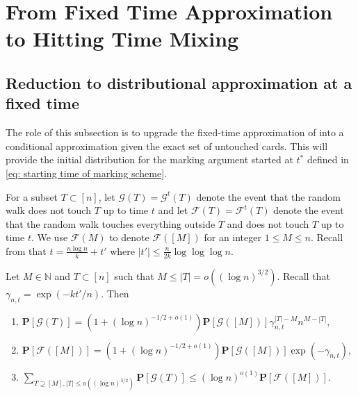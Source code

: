 \section{From Fixed Time Approximation to Hitting Time Mixing}\label{sec: fixed to hitting}

\subsection{Reduction to distributional approximation at a fixed time}
The role of this subsection is to upgrade the fixed-time approximation of  into a conditional approximation given the exact set of untouched cards. This will provide the initial distribution for the marking argument started at $t^*$ defined in \eqref{eq: starting time of marking scheme}.

For a subset $T \subset [n]$, let $\mathcal{G}(T) = \mathcal{G}^t(T)$ denote the event that the random walk does not touch $T$ up to time $t$ and let $\mathcal{F}(T) = \mathcal{F}^t(T)$ denote the event that the random walk touches everything outside $T$ and does not touch $T$ up to time $t$. We use $\mathcal{F}(M)$ to denote $\mathcal{F}([M])$ for an integer $1\leq M \leq n$. Recall from  that $t =  \frac{n \log n}{k}  + t'$ where $|t'| \leq \frac{n}{2k}\log \log \log n$.


\begin{lemma}\label{lemma::Self-reduction lemma}
    Let $M \in \mathbb{N}$ and $T \subset [n]$ such that $M \leq |T| = o((\log n)^{3/2})$. Recall that $\gamma_{n,t} = \exp(-kt'/n).$ Then
    \begin{enumerate}
        \item $\mathbf{P}[\mathcal{G}(T)] = (1+(\log n)^{-1/2+o(1)})\mathbf{P}[\mathcal{G}([M])]\gamma_{n,t}^{|T| - M}n^{M-|T|}$,
        \item $\mathbf{P}[\mathcal{F}([M])] =(1+(\log n)^{-1/2+o(1)})\mathbf{P}[\mathcal{G}([M])]\exp(-\gamma_{n,t})$,
        \item $\sum_{T \supseteq [M], |T| \leq o((\log n)^{3/2})} \mathbf{P}[\mathcal{G}(T)] \leq (\log n)^{o(1)}\mathbf{P}[\mathcal{F}([M])]$.
    \end{enumerate}
\end{lemma}

